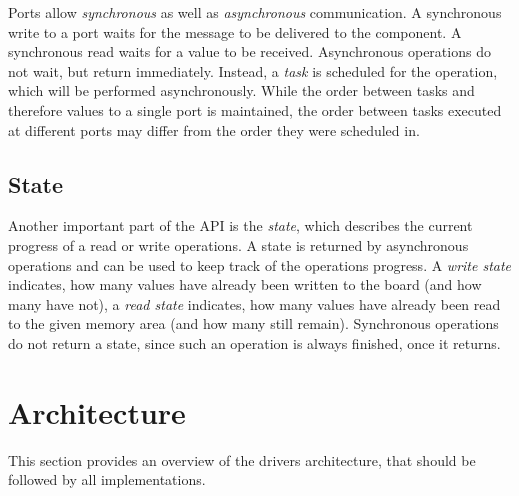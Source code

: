 \documentclass{report}
\begin{document}
Ports allow \textit{synchronous} as well as \textit{asynchronous} communication. A synchronous write to a port waits for the message to be delivered to the component. A synchronous read waits for a value to be received. Asynchronous operations do not wait, but return immediately. Instead, a \textit{task} is scheduled for the operation, which will be performed asynchronously. While the order between tasks and therefore values to a single port is maintained, the order between tasks executed at different ports may differ from the order they were scheduled in.

\subsection{State}
\label{sec:api:state}
Another important part of the API is the \textit{state}, which describes the current progress of a read or write operations. A state is returned by asynchronous operations and can be used to keep track of the operations progress. A \textit{write state} indicates, how many values have already been written to the board (and how many have not), a \textit{read state} indicates, how many values have already been read to the given memory area (and how many still remain).
Synchronous operations do not return a state, since such an operation is always finished, once it returns.

\section{Architecture}
\label{sec:arch}

This section provides an overview of the drivers architecture, that should be followed by all implementations.
\end{document}
